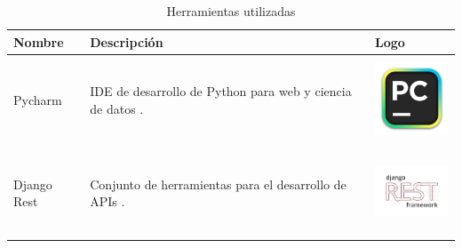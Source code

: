 \begin{table}[H]
    \centering
    \begin{tabular}{|m{2.5cm}|m{6cm}|m{3cm}|}
        \hline
        \textbf{Nombre} &  \textbf{Descripción} & \textbf{Logo} \\
        \hline
        Pycharm &  IDE de desarrollo de Python para web y ciencia de datos \cite{PycharmIDE}. & \includegraphics[width=2.5cm, height=2.5cm,keepaspectratio]{../02Figures/02Chapter/pycharm-logo.png} \\
        \hline
        Django Rest &  Conjunto de herramientas para el desarrollo de APIs  \cite{DRFweb}. & \includegraphics[width=2.5cm, height=2.5cm,keepaspectratio]{../02Figures/02Chapter/drf-logo.png} \\
        \hline
        \hline
        
    \end{tabular}
    \caption{Herramientas utilizadas}
    \label{tab:Tabla de herramientas utilizadas}
\end{table}
